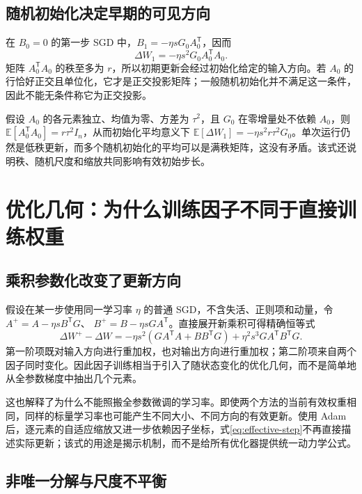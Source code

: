 \documentclass[UTF8,12pt,a4paper,fontset=fandol]{ctexart}
\begin{document}
\subsection{随机初始化决定早期的可见方向}

在 $B_0=0$ 的第一步 SGD 中，$B_1=-\eta sG_0A_0^{\mathsf T}$，因而
\begin{equation}
\Delta W_1=-\eta s^2G_0A_0^{\mathsf T}A_0.
\label{eq:first-step}
\end{equation}
矩阵 $A_0^{\mathsf T}A_0$ 的秩至多为 $r$，所以初期更新会经过初始化给定的输入方向。若 $A_0$ 的行恰好正交且单位化，它才是正交投影矩阵；一般随机初始化并不满足这一条件，因此不能无条件称它为正交投影。

假设 $A_0$ 的各元素独立、均值为零、方差为 $\tau^2$，且 $G_0$ 在零增量处不依赖 $A_0$，则
$\mathbb E[A_0^{\mathsf T}A_0]=r\tau^2I_n$，从而初始化平均意义下
$\mathbb E[\Delta W_1]=-\eta s^2r\tau^2G_0$。单次运行仍然是低秩更新，而多个随机初始化的平均可以是满秩矩阵，这没有矛盾。该式还说明秩、随机尺度和缩放共同影响有效初始步长。

\section{优化几何：为什么训练因子不同于直接训练权重}
\label{sec:geometry}

\subsection{乘积参数化改变了更新方向}

假设在某一步使用同一学习率 $\eta$ 的普通 SGD，不含失活、正则项和动量，令
$A^+=A-\eta sB^{\mathsf T}G$、
$B^+=B-\eta sGA^{\mathsf T}$。直接展开新乘积可得精确恒等式
\begin{equation}
\Delta W^+-\Delta W
=-\eta s^2\left(GA^{\mathsf T}A+BB^{\mathsf T}G\right)
+\eta^2s^3GA^{\mathsf T}B^{\mathsf T}G.
\label{eq:effective-step}
\end{equation}
第一阶项既对输入方向进行重加权，也对输出方向进行重加权；第二阶项来自两个因子同时变化。因此因子训练相当于引入了随状态变化的优化几何，而不是简单地从全参数梯度中抽出几个元素。

这也解释了为什么不能照搬全参数微调的学习率。即使两个方法的当前有效权重相同，同样的标量学习率也可能产生不同大小、不同方向的有效更新。使用 Adam 后，逐元素的自适应缩放又进一步依赖因子坐标，式\eqref{eq:effective-step}不再直接描述实际更新；该式的用途是揭示机制，而不是给所有优化器提供统一动力学公式。

\subsection{非唯一分解与尺度不平衡}
\end{document}
